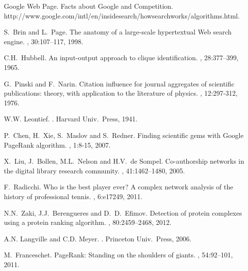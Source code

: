 \documentclass[11pt,draftcls,onecolumn]{IEEEtran}
\begin{document}
\begin{table}[t]
\newpage

\begin{thebibliography}{1}

Google Web Page. 
\newblock Facts about Google and Competition.
\newblock http://www.google.com/intl/en/insidesearch/howsearchworks/algorithms.html.



S.~Brin and L.~Page.
\newblock The anatomy of a large-scale hypertextual {Web} search engine.
, 30:107--117, 1998.


C.{\;}H.\ Hubbell.
\newblock An input-output approach to clique identification.
, 28:377--399, 1965.

G.~Pinski and F.~Narin.
\newblock Citation influence for journal aggregates of scientific
publications: theory, with application to the literature of physics.
, 12:297-312, 1976.

W.{\;}W. Leontief.
.
\newblock Harvard Univ.\ Press, 1941.

P.~Chen, H.~Xie, S.~Maslov and S.~Redner. 
\newblock Finding scientific gems with Google PageRank algorithm.
, 1:8-15, 2007.

X.~Liu, J.~Bollen, M.\;L.~Nelson and H.\;V.~de Sompel.
\newblock Co-authorship
networks in the digital library research community. 
, 41:1462--1480, 2005.

F.~Radicchi.
\newblock Who is the best player ever? A complex network analysis of the history of professional tennis.
, 6:e17249, 2011.

N.{\;}N.~Zaki, J.{\;}J.~Berengueres and D.~{\;}D.~Efimov.
\newblock Detection of protein complexes using a protein ranking algorithm.
, 80:2459--2468, 2012.

A.{\;}N. Langville and C.{\;}D. Meyer.
.
\newblock Princeton Univ.\ Press, 2006.


M.~Franceschet.
\newblock Page{R}ank: Standing on the shoulders of giants.
, 54:92--101, 2011.


\end{thebibliography}
\end{table}
\end{document}
